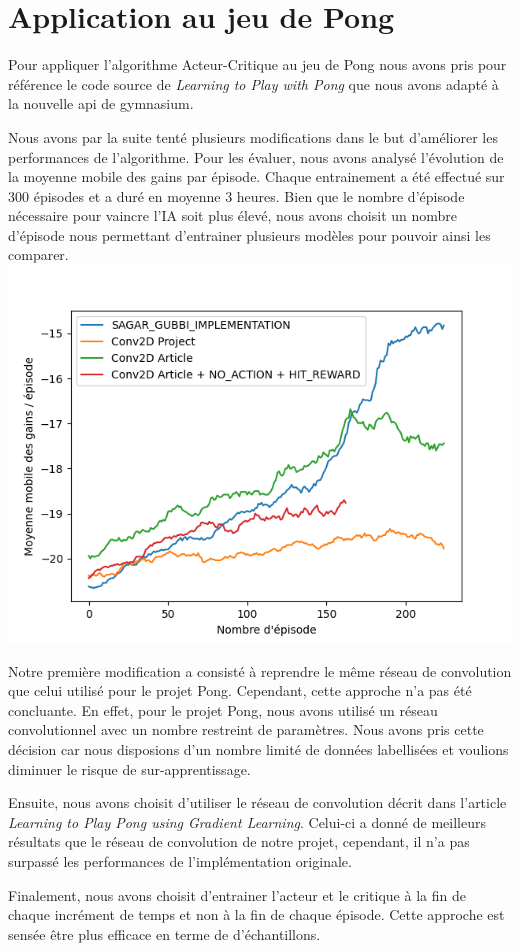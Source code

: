 \section{Application au jeu de Pong}

Pour appliquer l'algorithme Acteur-Critique au jeu de Pong nous avons pris pour référence le code source
de \emph{Learning to Play with Pong}\cite{PongGithub} que nous avons adapté à la nouvelle api de gymnasium.

Nous avons par la suite tenté plusieurs modifications dans le but d'améliorer les performances de l'algorithme.
Pour les évaluer, nous avons analysé l'évolution de la moyenne mobile des gains par épisode.
Chaque entrainement a été effectué sur 300 épisodes et a duré en moyenne 3 heures. Bien que le nombre d'épisode nécessaire
pour vaincre l'IA soit plus élevé, nous avons choisit un nombre d'épisode nous permettant d'entrainer plusieurs modèles pour pouvoir ainsi les comparer.
\includegraphics[width=\linewidth]{rolling_average_graph.png}

\par Notre première modification a consisté à reprendre le même réseau de convolution que celui utilisé pour le projet Pong. 
Cependant, cette approche n'a pas été concluante. 
En effet, pour le projet Pong, nous avons utilisé un réseau convolutionnel avec un nombre restreint de 
paramètres. Nous avons pris cette décision car nous disposions d'un nombre limité de données labellisées 
et voulions diminuer le risque de sur-apprentissage. 

\par Ensuite, nous avons choisit d'utiliser le réseau de convolution 
décrit dans l'article \emph{Learning to Play Pong using Gradient Learning}\cite{PongPolicyGradient}.
Celui-ci a donné de meilleurs résultats que le réseau de convolution de notre projet, cependant, il n'a pas surpassé 
les performances de l'implémentation originale.


\par Finalement, nous avons choisit d'entrainer l'acteur 
et le critique à la fin de chaque incrément de temps et non à la fin de chaque épisode.
Cette approche est sensée être plus efficace en terme de d'échantillons. %


